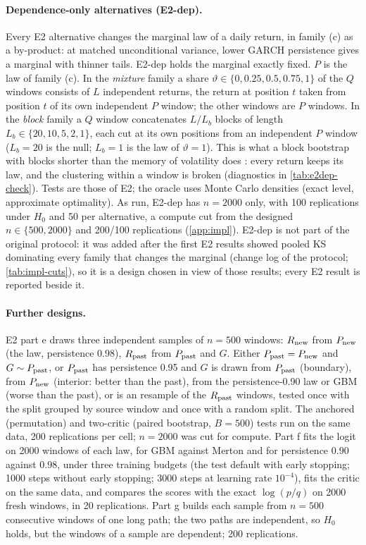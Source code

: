 \paragraph{Dependence-only alternatives (E2-dep).}
Every E2 alternative changes the marginal law of a daily return, in family (c) as a by-product: at
matched unconditional variance, lower GARCH persistence gives a marginal with thinner tails. E2-dep
holds the marginal exactly fixed. $P$ is the \GARCHt{} law of family (c). In the \emph{mixture}
family a share $\vartheta\in\{0,0.25,0.5,0.75,1\}$ of the $Q$ windows consists of $L$ independent
returns, the return at position $t$ taken from position $t$ of its own independent $P$ window; the
other windows are $P$ windows. In the \emph{block} family a $Q$ window concatenates $L/L_b$ blocks
of length $L_b\in\{20,10,5,2,1\}$, each cut at its own positions from an independent $P$ window
($L_b=20$ is the null; $L_b=1$ is the law of $\vartheta=1$). This is what a block bootstrap with
blocks shorter than the memory of volatility does \citep{kunsch1989jackknife,politis1994stationary}:
every return keeps its law, and the clustering within a window is broken (diagnostics in
\cref{tab:e2dep-check}). Tests are those of E2; the oracle uses Monte Carlo densities (exact level,
approximate optimality). As run, E2-dep has $n=2000$ only, with 100 replications under $H_0$ and 50
per alternative, a compute cut from the designed $n\in\{500,2000\}$ and 200/100 replications
(\cref{app:impl}). E2-dep is not part of the original protocol: it was added after the first E2
results showed pooled KS dominating every family that changes the marginal (change log of the
protocol; \cref{tab:impl-cuts}), so it is a design chosen in view of those results; every E2
result is reported beside it.

\paragraph{Further designs.}
E2 part e draws three independent samples of $n=500$ \iid{} windows: $R_{\mathrm{new}}$ from $P_{\mathrm{new}}$ (the
\GARCHt{} law, persistence 0.98), $R_{\mathrm{past}}$ from $P_{\mathrm{past}}$ and $G$. Either $P_{\mathrm{past}}=P_{\mathrm{new}}$ and
$G\sim P_{\mathrm{past}}$, or $P_{\mathrm{past}}$ has persistence 0.95 and $G$ is drawn from $P_{\mathrm{past}}$ (boundary), from
$P_{\mathrm{new}}$ (interior: better than the past), from the persistence-0.90 law or GBM (worse than the
past), or is an \iid{} resample of the $R_{\mathrm{past}}$ windows, tested once with the split grouped by
source window and once with a random split. The anchored (permutation) and two-critic (paired
bootstrap, $B=500$) tests run on the same data, 200 replications per cell; $n=2000$ was cut for
compute. Part f fits the \LRC{} logit on 2000 windows of each law, for GBM against Merton and for
persistence 0.90 against 0.98, under three training budgets (the test default with early stopping;
1000 steps without early stopping; 3000 steps at learning rate $10^{-4}$), fits the \WC{} critic on
the same data, and compares the scores with the exact $\log(p/q)$ on 2000 fresh windows, in 20
replications. Part g builds each sample from $n=500$ consecutive windows of one long \GARCHt{}
path; the two paths are independent, so $H_0$ holds, but the windows of a sample are dependent;
200 replications.

